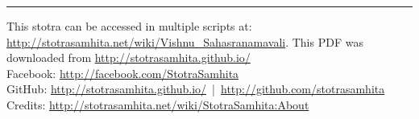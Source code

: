 \documentclass[a5paper,twoside,12pt]{book}
\begin{document}
\setmainfont[Script=Devanagari,Mapping=tex-text]{Sanskrit 2003}
\fontsize {16}{19.25}\selectfont

\vfill
\hrule
\footnotesize
{}
\noindent\textsf{This stotra can be accessed in multiple scripts at:\\
\url{http://stotrasamhita.net/wiki/Vishnu_Sahasranamavali}. This PDF was downloaded from \url{http://stotrasamhita.github.io/}\\[1ex]
Facebook: \url{http://facebook.com/StotraSamhita}\\[0.7ex]
GitHub: \url{http://stotrasamhita.github.io/}~|~\url{http://github.com/stotrasamhita}\\[0.7ex]
Credits: \url{http://stotrasamhita.net/wiki/StotraSamhita:About}}
\end{document}

